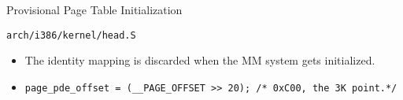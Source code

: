 \begin{frame}{Provisional Page Table Initialization}
  \begin{block}{\texttt{arch/i386/kernel/head.S}}
    \begin{center}
    \end{center}
  \end{block}
\end{frame}

\begin{itemize}
\item The identity mapping is discarded when the MM system gets initialized.
\item \texttt{page_pde_offset = (__PAGE_OFFSET >> 20); /* 0xC00, the 3K point.*/}
  

\end{itemize}
